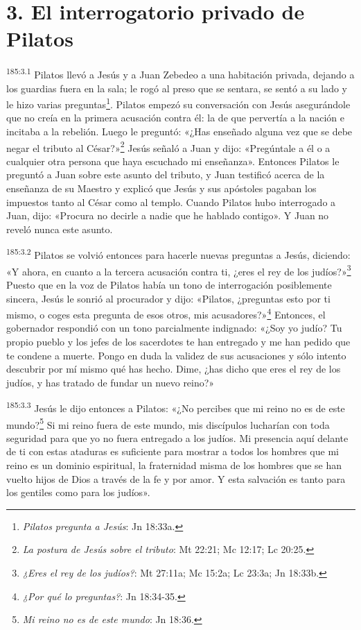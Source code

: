 \section*{3. El interrogatorio privado de Pilatos}
\par 
\textsuperscript{185:3.1} Pilatos llevó a Jesús y a Juan Zebedeo a una habitación privada, dejando a los guardias fuera en la sala; le rogó al preso que se sentara, se sentó a su lado y le hizo varias preguntas\footnote{\textit{Pilatos pregunta a Jesús}: Jn 18:33a.}. Pilatos empezó su conversación con Jesús asegurándole que no creía en la primera acusación contra él: la de que pervertía a la nación e incitaba a la rebelión. Luego le preguntó: «¿Has enseñado alguna vez que se debe negar el tributo al César?»\footnote{\textit{La postura de Jesús sobre el tributo}: Mt 22:21; Mc 12:17; Lc 20:25.} Jesús señaló a Juan y dijo: «Pregúntale a él o a cualquier otra persona que haya escuchado mi enseñanza». Entonces Pilatos le preguntó a Juan sobre este asunto del tributo, y Juan testificó acerca de la enseñanza de su Maestro y explicó que Jesús y sus apóstoles pagaban los impuestos tanto al César como al templo. Cuando Pilatos hubo interrogado a Juan, dijo: «Procura no decirle a nadie que he hablado contigo». Y Juan no reveló nunca este asunto.

\par 
\textsuperscript{185:3.2} Pilatos se volvió entonces para hacerle nuevas preguntas a Jesús, diciendo: «Y ahora, en cuanto a la tercera acusación contra ti, ¿eres el rey de los judíos?»\footnote{\textit{¿Eres el rey de los judíos?}: Mt 27:11a; Mc 15:2a; Lc 23:3a; Jn 18:33b.} Puesto que en la voz de Pilatos había un tono de interrogación posiblemente sincera, Jesús le sonrió al procurador y dijo: «Pilatos, ¿preguntas esto por ti mismo, o coges esta pregunta de esos otros, mis acusadores?»\footnote{\textit{¿Por qué lo preguntas?}: Jn 18:34-35.} Entonces, el gobernador respondió con un tono parcialmente indignado: «¿Soy yo judío? Tu propio pueblo y los jefes de los sacerdotes te han entregado y me han pedido que te condene a muerte. Pongo en duda la validez de sus acusaciones y sólo intento descubrir por mí mismo qué has hecho. Dime, ¿has dicho que eres el rey de los judíos, y has tratado de fundar un nuevo reino?»

\par 
\textsuperscript{185:3.3} Jesús le dijo entonces a Pilatos: «¿No percibes que mi reino no es de este mundo?\footnote{\textit{Mi reino no es de este mundo}: Jn 18:36.} Si mi reino fuera de este mundo, mis discípulos lucharían con toda seguridad para que yo no fuera entregado a los judíos. Mi presencia aquí delante de ti con estas ataduras es suficiente para mostrar a todos los hombres que mi reino es un dominio espiritual, la fraternidad misma de los hombres que se han vuelto hijos de Dios a través de la fe y por amor. Y esta salvación es tanto para los gentiles como para los judíos».

